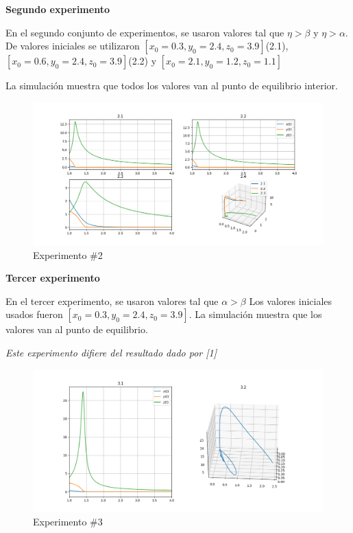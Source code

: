 \documentclass{wscpaperproc}
\theoremstyle{wsc}
\begin{document}
\vspace*{7cm}
{\bf Segundo experimento}

En el segundo conjunto de experimentos, se usaron valores tal que $\eta > \beta$ y $\eta > \alpha$.
De valores iniciales se utilizaron $[x_0=0.3, y_0=2.4, z_0=3.9]$(2.1),
$[x_0=0.6, y_0=2.4, z_0=3.9]$(2.2) y $[x_0=2.1, y_0=1.2, z_0=1.1]$

La simulación muestra que todos los valores van al punto de equilibrio interior.

\begin{figure}[h!]
	\includegraphics[width=\linewidth]{../numerical_models/images/2.png}
	\caption{Experimento \#2}
\end{figure}

\vspace*{4cm}
{\bf Tercer experimento}

En el tercer experimento, se usaron valores tal que $\alpha > \beta$
Los valores iniciales usados fueron $[x_0=0.3, y_0=2.4, z_0=3.9]$. La simulación muestra
que los valores van al punto de equilibrio.

	{\it Este experimento difiere del resultado dado por [1]}

\begin{figure}[h!]
	\includegraphics[width=\linewidth]{../numerical_models/images/3.png}
	\caption{Experimento \#3}
\end{figure}
\end{document}
